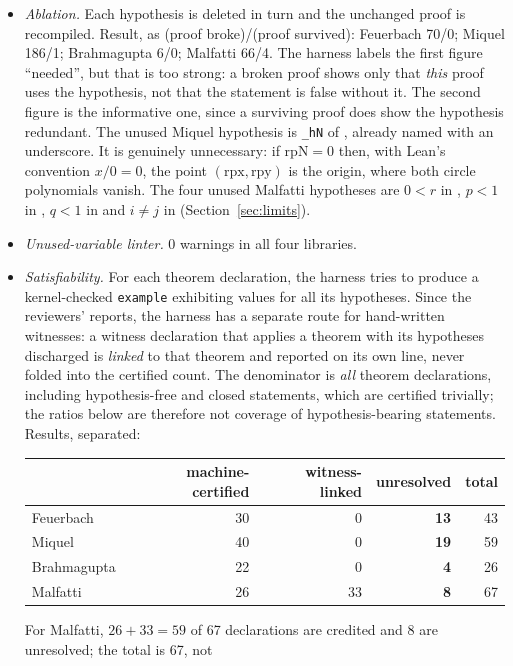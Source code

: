 \documentclass[11pt]{article}
\theoremstyle{definition}
\theoremstyle{remark}
\newcommand{\lean}[1]{\texttt{#1}}
\begin{document}
\begin{itemize}
\item \emph{Ablation.} Each hypothesis is deleted in turn and the unchanged proof is recompiled.
Result, as (proof broke)/(proof survived): Feuerbach 70/0; Miquel 186/1; Brahmagupta 6/0; Malfatti
66/4. The harness labels the first figure ``needed'', but that is too strong: a broken proof shows
only that \emph{this} proof uses the hypothesis, not that the statement is false without it. The
second figure is the informative one, since a surviving proof does show the hypothesis redundant. The unused Miquel hypothesis is \lean{\_hN} of , already
named with an underscore. It is genuinely unnecessary: if $\mathrm{rpN}=0$ then, with Lean's
convention $x/0=0$, the point $(\mathrm{rpx},\mathrm{rpy})$ is the origin, where both circle
polynomials vanish. The four unused Malfatti hypotheses are $0<r$ in ,
$p<1$ in , $q<1$ in  and $i\ne j$ in
 (Section~\ref{sec:limits}).
\item \emph{Unused-variable linter.} 0 warnings in all four libraries.
\item \emph{Satisfiability.} For each theorem declaration, the harness tries to produce a
kernel-checked \lean{example} exhibiting values for all its hypotheses. Since the reviewers'
reports, the harness has a separate route for hand-written witnesses: a witness declaration that
applies a theorem with its hypotheses discharged is \emph{linked} to that theorem and reported on
its own line, never folded into the certified count. The denominator is \emph{all} theorem
declarations, including hypothesis-free and closed statements, which are certified trivially; the
ratios below are therefore not coverage of hypothesis-bearing statements. Results, separated:
\begin{center}\small
\begin{tabular}{@{}lrrrr@{}}
\toprule
 & machine-certified & witness-linked & unresolved & total \\ \midrule
Feuerbach & 30 & 0 & \textbf{13} & 43 \\
Miquel & 40 & 0 & \textbf{19} & 59 \\
Brahmagupta & 22 & 0 & \textbf{4} & 26 \\
Malfatti & 26 & 33 & \textbf{8} & 67 \\
\bottomrule
\end{tabular}
\end{center}
For Malfatti, $26+33=59$ of 67 declarations are credited and 8 are unresolved; the total is 67, not

\end{itemize}
\end{document}
